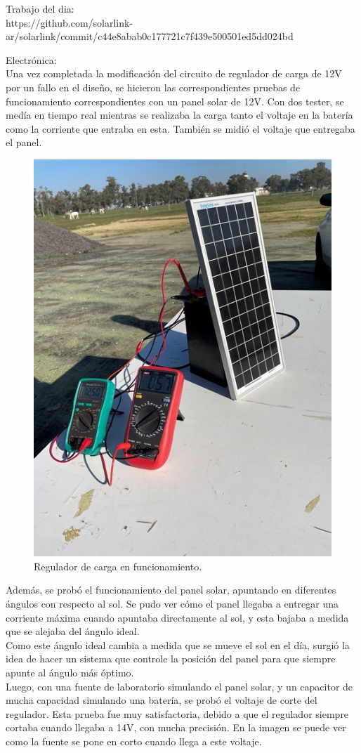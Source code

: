 Trabajo del dia:\\
https://github.com/solarlink-\\ar/solarlink/commit/c44e8abab0c177721c7f439e500501ed5dd024bd

Electrónica:\\

Una vez completada la modificación del circuito de regulador de carga de 12V por un fallo en el diseño, se hicieron las correspondientes pruebas de funcionamiento correspondientes con un panel solar de 12V. Con dos tester, se medía en tiempo real mientras se realizaba la carga tanto el voltaje en la batería como la corriente que entraba en esta. También se midió el voltaje que entregaba el panel.\\

\begin{figure}[H]
    \centering
    \includegraphics[width=0.5\linewidth]{informes/IMG_8112.jpg}
    \caption{Regulador de carga en funcionamiento.}
\end{figure}

Además, se probó el funcionamiento del panel solar, apuntando en diferentes ángulos con respecto al sol. Se pudo ver cómo el panel llegaba a entregar una corriente máxima cuando apuntaba directamente al sol, y esta bajaba a medida que se alejaba del ángulo ideal. \\

Como este ángulo ideal cambia a medida que se mueve el sol en el día, surgió la idea de hacer un sistema que controle la posición del panel para que siempre apunte al ángulo más óptimo.\\

Luego, con una fuente de laboratorio simulando el panel solar, y un capacitor de mucha capacidad simulando una batería, se probó el voltaje de corte del regulador. Esta prueba fue muy satisfactoria, debido a que el regulador siempre cortaba cuando llegaba a 14V, con mucha precisión. En la imagen se puede ver como la fuente se pone en corto cuando llega a este voltaje.\\

